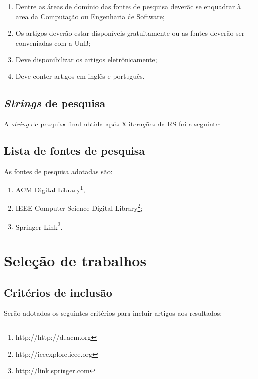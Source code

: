 \begin{enumerate}
    \item Dentre as áreas de domínio das fontes de pesquisa deverão se enquadrar à area da Computação ou Engenharia de Software;
    \item Os artigos deverão estar disponíveis gratuitamente ou as fontes deverão ser conveniadas com a UnB;
    \item Deve disponibilizar os artigos eletrônicamente;
    \item Deve conter artigos em inglês e português.
\end{enumerate}

\subsection{\textit{Strings} de pesquisa}

A \textit{string} de pesquisa final obtida após X iterações da RS foi a seguinte:


\subsection{Lista de fontes de pesquisa}

As fontes de pesquisa adotadas são:
\begin{enumerate}
    \item ACM Digital Library\footnote{http://http://dl.acm.org};
    \item IEEE Computer Science Digital Library\footnote{http://ieeexplore.ieee.org};
    \item Springer Link\footnote{http://link.springer.com}.
\end{enumerate}

\section{Seleção de trabalhos}

\subsection{Critérios de inclusão}

Serão adotados os seguintes critérios para incluir artigos aos resultados:

